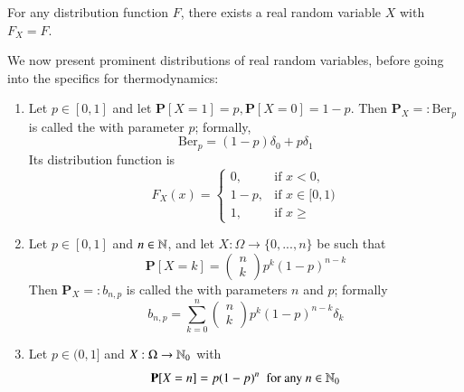 \documentclass[12pt, a4paper, oneside, openright, titlepage]{book}
\begin{document}
\begin{thm}
    For any distribution function $F$, there exists a real random variable $X$ with $F_X = F$.
\end{thm}

We now present prominent distributions of real random variables, before going into the specifics for thermodynamics:

\begin{eg}
    \leavevmode
    \begin{enumerate}[label=\roman*]
        \item Let $p \in [0,1]$ and let $\mathbf{P}[X=1] = p,\mathbf{P}[X=0] = 1-p$. Then $\mathbf{P}_X =: \text{Ber}_p$ is called the  with parameter $p$; formally, \begin{equation*}
                \text{Ber}_p = (1-p)\delta_0+p\delta_1
        \end{equation*}
            Its distribution function is \begin{equation*}
                F_X(x) = \left\{\begin{array}{cc} 0, & \text{if } x < 0, \\ 1-p, & \text{if } x \in [0,1) \\ 1, & \text{if } x \geq \end{array}\right.
            \end{equation*}
        \item Let $p \in [0,1]$ and $n \in \mathbb N$, and let $X:\Omega\rightarrow \{0,...,n\}$ be such that \begin{equation*}
                \mathbf{P}[X=k] = \begin{pmatrix} n \\ k \end{pmatrix} p^k(1-p)^{n-k}
        \end{equation*}
            Then $\mathbf{P}_X =: b_{n,p}$ is called the  with parameters $n$ and $p$; formally \begin{equation*}
                b_{n,p} = \sum_{k=0}^n\begin{pmatrix} n\\ k\end{pmatrix}p^k(1-p)^{n-k}\delta_k
            \end{equation*}
        \item Let $p \in (0,1]$ and $X:\Omega\rightarrow \mathbb N_0$ with \begin{equation*}
                \mathbf{P}[X=n] = p(1-p)^n\;\text{ for any } n \in \N_0

\end{equation*}
\end{enumerate}
\end{eg}
\end{document}
